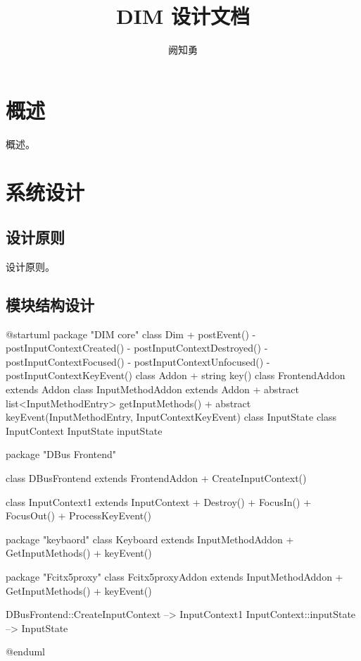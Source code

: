 \documentclass{utart}
\title{DIM 设计文档}
\author{阙知勇}
\begin{document}
\utMakeTitle{}


\utMakeTOC

\section{概述}

概述。

\section{系统设计}

    \subsection{设计原则}

        设计原则。

    \subsection{模块结构设计}
        \begin{plantuml}
        @startuml
        package "DIM core" {
            class Dim {
                + postEvent()
                - postInputContextCreated()
                - postInputContextDestroyed()
                - postInputContextFocused()
                - postInputContextUnfocused()
                - postInputContextKeyEvent()
            }
            class Addon {
                + string key()
            }
            class FrontendAddon extends Addon {
            }
            class InputMethodAddon extends Addon {
                + {abstract} list<InputMethodEntry> getInputMethods()
                + {abstract} keyEvent(InputMethodEntry, InputContextKeyEvent)
            }
            class InputState {
            }
            class InputContext {
                InputState inputState
            }
        }

        package "DBus Frontend" {
            class DBusFrontend extends FrontendAddon {
                + CreateInputContext()
            }

            class InputContext1 extends InputContext {
                + Destroy()
                + FocusIn()
                + FocusOut()
                + ProcessKeyEvent()
            }
        }

        package "keybaord" {
            class Keyboard extends InputMethodAddon {
                + GetInputMethods()
                + keyEvent()
            }
        }

        package "Fcitx5proxy" {
            class Fcitx5proxyAddon extends InputMethodAddon {
                + GetInputMethods()
                + keyEvent()
            }
        }

        DBusFrontend::CreateInputContext --> InputContext1
        InputContext::inputState --> InputState

        @enduml
        \end{plantuml}
\end{document}
